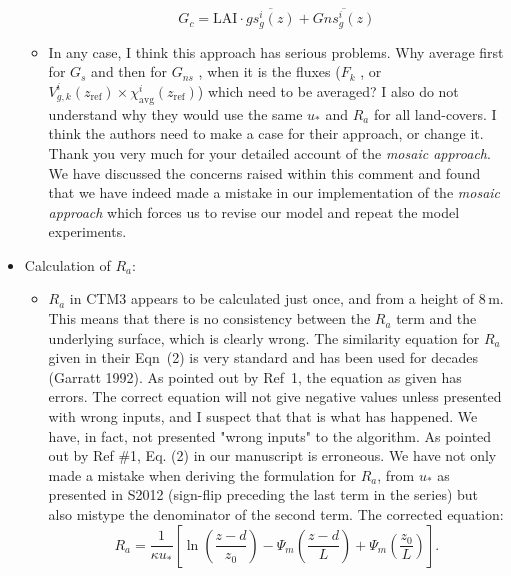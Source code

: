 \documentclass{scrartcl}
\begin{document}
\begin{itemize}
\begin{itemize}
\begin{equation}
      \label{eq:Gsto_corr}
      G_c = \mathrm{LAI} \cdot \overline{gs^i_g(z)} + \overline{Gns^i_g(z)}
    \end{equation}
  \item {\color{blue} In any case, I think this approach has serious problems. Why average first for $G_s$ and then for $G_{ns}$ , when it is the fluxes ($F_k$ , or $V^i_{g,k}(z_\mathrm{ref}) \times \chi^i_\mathrm{avg}(z_\mathrm{ref})$) which need to be averaged? I also do not understand why they would use the same $u_*$ and $R_a$ for all land-covers. I think the authors need to make a case for their approach, or change it.}
    Thank you very much for your detailed account of the \emph{mosaic approach}. We have discussed the concerns raised within this comment and found that we have indeed made a mistake in our implementation of the \emph{mosaic approach} which forces us to revise our model and repeat the model experiments.
  \end{itemize}
\item {\color{blue} Calculation of $R_a$:}
  \begin{itemize}
  \item {\color{blue} $R_a$ in CTM3 appears to be calculated just once, and from a height of 8\,m. This means
that there is no consistency between the $R_a$ term and the underlying surface, which is
clearly wrong. The similarity equation for $R_a$ given in their Eqn~(2) is very standard and has been
used for decades (Garratt 1992). As pointed out by Ref~1, the equation as given has
errors. The correct equation will not give negative values unless presented with wrong
inputs, and I suspect that that is what has happened.}
We have, in fact, not presented "wrong inputs" to the algorithm.
As pointed out by Ref \#1, Eq. (2) in our manuscript is erroneous. We have not only made a mistake when deriving the formulation for $R_a$, from $u_*$ as presented in S2012 (sign-flip preceding the last term in the series) but also mistype the denominator of the second term. The corrected equation:
\begin{equation}
  R_a = \frac{1}{\kappa u_*}\left[{\ln{\left(\frac{z-d}{z_0}\right)}-\Psi_m\left(\frac{z-d}{L}\right)+\Psi_m\left(\frac{z_0}{L}\right)}\right].
  \label{eq:aero_res}
\end{equation}



\end{itemize}
\end{itemize}
\end{document}
